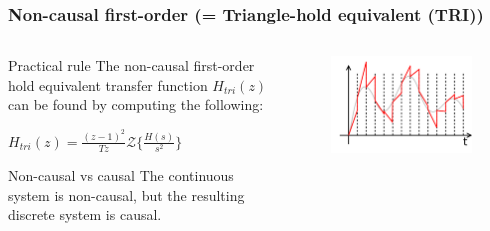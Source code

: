 \begin{frame}
	\frametitle{Non-causal first-order (= Triangle-hold equivalent (TRI))}
\begin{columns}
	\begin{column}{0.5\textwidth}
	\begin{block}{Practical rule}
		The non-causal first-order hold equivalent transfer function $H_{tri}(z)$ can be found by computing the following:
		\begin{center}
			$H_{tri}(z) = \frac{(z-1)^{2}}{Tz} \mathcal{Z}\{\frac{H(s)}{s^{2}}\}$
		\end{center}
	\end{block}
	
	\begin{alertblock}{Non-causal vs causal}
		The continuous system is non-causal, but the resulting discrete system is causal.
	\end{alertblock}
	\end{column}
	
	\begin{column}{0.5\textwidth}
		\begin{figure}
			\centering
			\includegraphics[width=1\linewidth]{first-order}
		\end{figure}
	\end{column}
\end{columns}
\end{frame}

